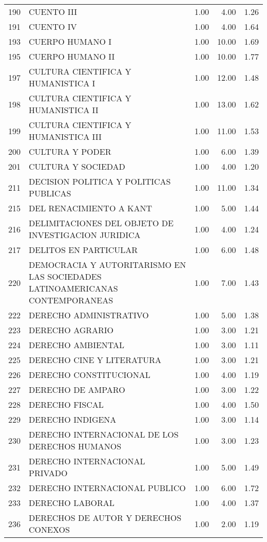 \begin{table}[ht]
\begin{tabular}{rlrrr}
  190 & CUENTO III & 1.00 & 4.00 & 1.26 \\ 
  191 & CUENTO IV & 1.00 & 4.00 & 1.64 \\ 
  193 & CUERPO HUMANO I & 1.00 & 10.00 & 1.69 \\ 
  195 & CUERPO HUMANO II & 1.00 & 10.00 & 1.77 \\ 
  197 & CULTURA CIENTIFICA Y HUMANISTICA I & 1.00 & 12.00 & 1.48 \\ 
  198 & CULTURA CIENTIFICA Y HUMANISTICA II & 1.00 & 13.00 & 1.62 \\ 
  199 & CULTURA CIENTIFICA Y HUMANISTICA III & 1.00 & 11.00 & 1.53 \\ 
  200 & CULTURA Y PODER & 1.00 & 6.00 & 1.39 \\ 
  201 & CULTURA Y SOCIEDAD & 1.00 & 4.00 & 1.20 \\ 
  211 & DECISION POLITICA Y POLITICAS PUBLICAS & 1.00 & 11.00 & 1.34 \\ 
  215 & DEL RENACIMIENTO A KANT & 1.00 & 5.00 & 1.44 \\ 
  216 & DELIMITACIONES DEL OBJETO DE INVESTIGACION JURIDICA & 1.00 & 4.00 & 1.24 \\ 
  217 & DELITOS EN PARTICULAR & 1.00 & 6.00 & 1.48 \\ 
  220 & DEMOCRACIA Y AUTORITARISMO EN LAS SOCIEDADES LATINOAMERICANAS CONTEMPORANEAS & 1.00 & 7.00 & 1.43 \\ 
  222 & DERECHO ADMINISTRATIVO & 1.00 & 5.00 & 1.38 \\ 
  223 & DERECHO AGRARIO & 1.00 & 3.00 & 1.21 \\ 
  224 & DERECHO AMBIENTAL & 1.00 & 3.00 & 1.11 \\ 
  225 & DERECHO CINE Y LITERATURA & 1.00 & 3.00 & 1.21 \\ 
  226 & DERECHO CONSTITUCIONAL & 1.00 & 4.00 & 1.19 \\ 
  227 & DERECHO DE AMPARO & 1.00 & 3.00 & 1.22 \\ 
  228 & DERECHO FISCAL & 1.00 & 4.00 & 1.50 \\ 
  229 & DERECHO INDIGENA & 1.00 & 3.00 & 1.14 \\ 
  230 & DERECHO INTERNACIONAL DE LOS DERECHOS HUMANOS & 1.00 & 3.00 & 1.23 \\ 
  231 & DERECHO INTERNACIONAL PRIVADO & 1.00 & 5.00 & 1.49 \\ 
  232 & DERECHO INTERNACIONAL PUBLICO & 1.00 & 6.00 & 1.72 \\ 
  233 & DERECHO LABORAL & 1.00 & 4.00 & 1.37 \\ 
  236 & DERECHOS DE AUTOR Y DERECHOS CONEXOS & 1.00 & 2.00 & 1.19 \\ 

\end{tabular}
\end{table}
